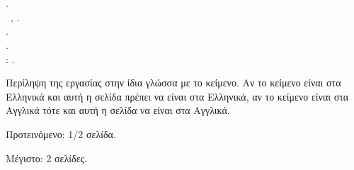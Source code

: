 \chapter*{\abstractname}
\addstarredchapter{\abstractname} %

\makeatletter
\@author.\\
\cseabstracttype\ifPhD\else\ \cseabstractcs\fi, \@date.\\
\cseabstractdpt.\\
\@title.\\
\cseabstractsup: \advisor.
\makeatother

\bigskip
\bigskip

\noindent Περίληψη της εργασίας στην ίδια γλώσσα με το κείμενο.
Αν το κείμενο είναι στα Ελληνικά και αυτή η σελίδα πρέπει να είναι στα Ελληνικά, αν το κείμενο είναι στα Αγγλικά τότε και αυτή η σελίδα να είναι στα Αγγλικά.

\bigskip

\noindent Προτεινόμενο: 1/2 σελίδα.

\noindent Μέγιστο: 2 σελίδες.